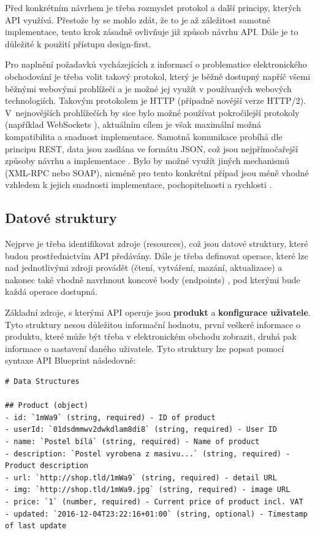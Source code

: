 \documentclass[FM,DP]{tulthesis}
\newenvironment{code}
    {\filbreak\captionsetup{type=listing}}{\filbreak}
\begin{document}
Před konkrétním návrhem je třeba rozmyslet protokol a další principy, kterých API využívá.
Přestože by se mohlo zdát, že to je až záležitost samotné implementace, tento krok zásadně
ovlivňuje již způsob návrhu API. Dále je to důležité k použití přístupu design-first.

Pro naplnění požadavků vycházejících z informací o problematice elektronického obchodování
je třeba volit takový protokol, který je běžně dostupný napříč všemi běžnými webovými
prohlížeči a je možné jej využít v používaných webových technologiích. Takovým protokolem
je HTTP (případně novější verze HTTP/2). V~nejnovějších prohlížečích by sice bylo možné
používat pokročilejší protokoly (například WebSockets \cite{websockets}), aktuálním cílem
je však maximální možná kompatibilita a snadnost implementace. Samotná komunikace probíhá
dle principu REST, data jsou zasílána ve formátu JSON, což jsou nejpřímočařejší způsoby
návrhu a implementace \cite{api}. Bylo by možné využít jiných mechanismů (XML-RPC nebo SOAP), 
nicméně pro tento konkrétní případ jsou méně vhodné vzhledem k jejich snadnosti implementace, 
pochopitelnosti a rychlosti \cite[strana~31]{api}.

\subsection{Datové struktury}

Nejprve je třeba identifikovat zdroje (resources), což jsou datové struktury, které
budou prostřednictvím API předávány. Dále je třeba definovat operace, které lze nad 
jednotlivými zdroji provádět (čtení, vytváření, mazání, aktualizace) a nakonec také 
vhodně navrhnout koncové body (endpoints) \cite[strana~12]{api}, pod kterými bude každá 
operace dostupná.

Základní zdroje, s kterými API operuje jsou \textbf{produkt} a \textbf{konfigurace uživatele}. 
Tyto struktury nesou důležitou informační hodnotu, první veškeré informace o produktu, 
které může být třeba v elektronickém obchodu zobrazit, druhá pak informace o nastavení 
daného uživatele. Tyto struktury lze popsat pomocí syntaxe API Blueprint \cite[strana~131]{api}
následovně:

\begin{code}
\captionsetup{singlelinecheck=false,justification=raggedright}
\label{code:api-product}
\begin{verbatim}
# Data Structures

## Product (object)
- id: `1mWa9` (string, required) - ID of product
- userId: `01dsdmmwv2dwkdlam8di8` (string, required) - User ID
- name: `Postel bílá` (string, required) - Name of product
- description: `Postel vyrobena z masivu...` (string, required) - Product description
- url: `http://shop.tld/1mWa9` (string, required) - detail URL
- img: `http://shop.tld/1mWa9.jpg` (string, required) - image URL
- price: `1` (number, required) - Current price of product incl. VAT
- updated: `2016-12-04T23:22:16+01:00` (string, optional) - Timestamp of last update
\end{verbatim}
\end{code}
\end{document}
